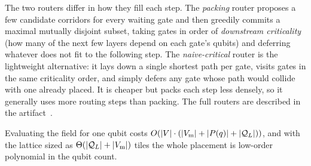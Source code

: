 The two routers differ in how they fill each step. The
\emph{packing} router proposes a few
candidate corridors for every waiting gate and then greedily commits a 
maximal mutually disjoint subset, taking gates
in order of \emph{downstream criticality} (how many of the next few layers depend
on each gate's qubits) and deferring whatever does not fit to the following step.
The \emph{naive-critical} router is the lightweight alternative: it lays down a
single shortest path per gate, visits gates in the same criticality order, and
simply defers any gate whose path would collide with one already placed.
It is cheaper but packs each step less densely, so it generally
uses more routing steps than packing. The full routers are described in the
artifact~\cite{ftqc}.



\begin{remark}
Evaluating the field for one qubit costs
$O(|V|\cdot(|V_{\mathrm m}|+|P(q)|+|\mathcal{Q}_L|))$, and with the lattice sized as
$\Theta(|\mathcal{Q}_L|+|V_{\mathrm m}|)$ tiles the whole placement is low-order
polynomial in the qubit count.
\end{remark}
